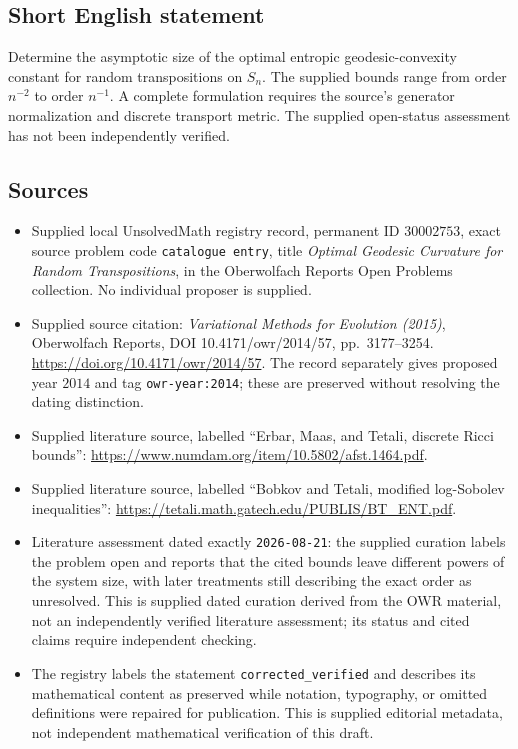 \documentclass[11pt]{article}
\begin{document}
\subsection{Short English statement}
Determine the asymptotic size of the optimal entropic geodesic-convexity constant for random transpositions on $S_n$. The supplied bounds range from order $n^{-2}$ to order $n^{-1}$. A complete formulation requires the source's generator normalization and discrete transport metric. The supplied open-status assessment has not been independently verified.
\subsection{Sources}
\begin{itemize}
\item Supplied local UnsolvedMath registry record, permanent ID $30002753$, exact source problem code \texttt{catalogue entry}, title \emph{Optimal Geodesic Curvature for Random Transpositions}, in the Oberwolfach Reports Open Problems collection. No individual proposer is supplied.
\item Supplied source citation: \emph{Variational Methods for Evolution (2015)}, Oberwolfach Reports, DOI 10.4171/owr/2014/57, pp.\ 3177--3254. \url{https://doi.org/10.4171/owr/2014/57}. The record separately gives proposed year $2014$ and tag \texttt{owr-year:2014}; these are preserved without resolving the dating distinction.
\item Supplied literature source, labelled ``Erbar, Maas, and Tetali, discrete Ricci bounds'': \url{https://www.numdam.org/item/10.5802/afst.1464.pdf}.
\item Supplied literature source, labelled ``Bobkov and Tetali, modified log-Sobolev inequalities'': \url{https://tetali.math.gatech.edu/PUBLIS/BT_ENT.pdf}.
\item Literature assessment dated exactly \texttt{2026-08-21}: the supplied curation labels the problem open and reports that the cited bounds leave different powers of the system size, with later treatments still describing the exact order as unresolved. This is supplied dated curation derived from the OWR material, not an independently verified literature assessment; its status and cited claims require independent checking.
\item The registry labels the statement \texttt{corrected\_verified} and describes its mathematical content as preserved while notation, typography, or omitted definitions were repaired for publication. This is supplied editorial metadata, not independent mathematical verification of this draft.
\end{itemize}
\end{document}
